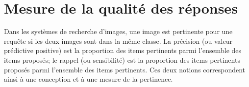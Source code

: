 %
%
%

\section{Mesure de la qualité des réponses}
Dans les systèmes de recherche d’images, une image est pertinente pour
une requête si les deux images sont dans la même classe.
La précision (ou valeur prédictive positive) est la proportion des items pertinents parmi l'ensemble des items proposés; le rappel (ou sensibilité) est la proportion des items pertinents proposés parmi l'ensemble des items pertinents. Ces deux notions correspondent ainsi à une conception et à une mesure de la pertinence.\\

